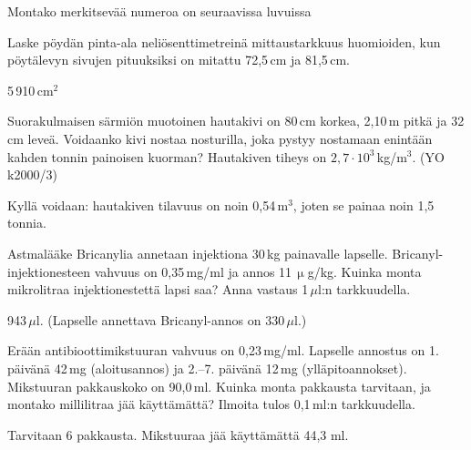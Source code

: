 \begin{tehtavasivu}
\begin{tehtava}
Montako merkitsevää numeroa on seuraavissa luvuissa
\begin{alakohdat}
\end{alakohdat}
\begin{vastaus}
\begin{alakohdat}
\end{alakohdat}
\end{vastaus}
\end{tehtava}


\begin{tehtava}
Laske pöydän pinta-ala neliösenttimetreinä mittaustarkkuus huomioiden, kun pöytälevyn sivujen pituuksiksi on mitattu 72,5\,cm ja 81,5\,cm.
\begin{vastaus}
5\,910\,cm$^2$
\end{vastaus}
\end{tehtava}

\begin{tehtava}
Suorakulmaisen särmiön muotoinen hautakivi on 80\,cm korkea, 2,10\,m pitkä ja 32\,cm leveä.
Voidaanko kivi nostaa nosturilla, joka pystyy nostamaan enintään kahden tonnin painoisen kuorman? Hautakiven tiheys on $2,7 \cdot 10^3$\,kg/m$^3$. (YO k2000/3)
\begin{vastaus}
Kyllä voidaan: hautakiven tilavuus on noin 0,54\,m$^3$, joten se painaa noin 1,5 tonnia.
\end{vastaus}
\end{tehtava}

\begin{tehtava}
Astmalääke Bricanylia annetaan injektiona 30\,kg painavalle lapselle. Bricanyl-injektionesteen vahvuus on 0,35\,mg/ml ja annos 11\,$\upmu$g/kg. Kuinka monta mikrolitraa injektionestettä lapsi saa? Anna vastaus 1\,$\mu$l:n tarkkuudella. %
 \begin{vastaus}
943\,$\mu$l. (Lapselle annettava Bricanyl-annos on 330\,$\mu$l.) %
 \end{vastaus}
\end{tehtava}

\begin{tehtava}
Erään antibioottimikstuuran vahvuus on 0,23\,mg/ml. Lapselle annostus on 1. päivänä 42\,mg (aloitusannos) 
ja 2.--7. päivänä 12\,mg (ylläpitoannokset). Mikstuuran pakkauskoko on 90,0\,ml. Kuinka monta pakkausta tarvitaan, ja montako millilitraa jää käyttämättä? Ilmoita tulos 0,1\,ml:n tarkkuudella.
 \begin{vastaus}
Tarvitaan 6 pakkausta. Mikstuuraa jää käyttämättä 44,3 ml.
 \end{vastaus}
\end{tehtava}


\end{tehtavasivu}
